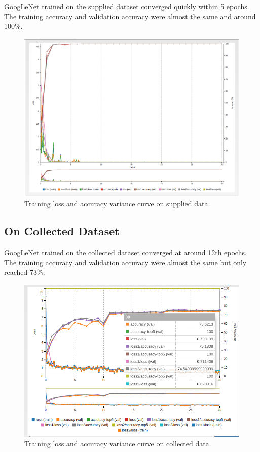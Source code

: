 \documentclass[10pt,journal,compsoc]{IEEEtran}
\begin{document}
GoogLeNet trained on the supplied dataset converged quickly within 5 epochs. The training accuracy and validation accuracy were almost the same and around 100\%.

\begin{figure}[thpb]
      \centering
      \includegraphics[width=\linewidth]{images/googlenet_training_loss.png}
      \caption{Training loss and accuracy variance curve on supplied data.}
      \label{fig:supplied-training-result}
\end{figure}



\subsection{On Collected Dataset}

GoogLeNet trained on the collected dataset converged at around 12th epochs. The training accuracy and validation accuracy were almost the same but only reached 73\%.

\begin{figure}[thpb]
      \centering
      \includegraphics[width=\linewidth]{images/googlenet_flowers_training_loss.png}
      \caption{Training loss and accuracy variance curve on collected data.}
      \label{fig:collected-training-result}
\end{figure}
\end{document}
